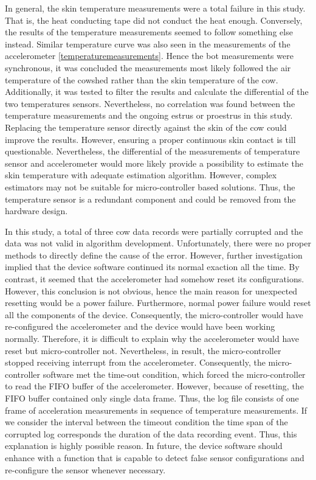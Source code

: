 \documentclass[english,12pt,a4paper,pdftex,elec,utf8]{aaltothesis}
\begin{document}
In general, the skin temperature measurements were a total failure in this study. That is, the heat conducting tape did not conduct the heat enough. Conversely, the results of the temperature measurements seemed to follow something else instead. Similar temperature curve was also seen in the measurements of the accelerometer \ref{temperaturemeasurements}. Hence the bot measurements were synchronous, it was concluded the measurements most likely followed the air temperature of the cowshed rather than the skin temperature of the cow. Additionally, it was tested to filter the results and calculate the differential of the two temperatures sensors. Nevertheless, no correlation was found between the temperature measurements and the ongoing estrus or proestrus in this study. Replacing the temperature sensor directly against the skin of the cow could improve the results. However, ensuring a proper continuous skin contact is till questionable. Nevertheless, the differential of the measurements of temperature sensor and accelerometer would more likely provide a possibility to estimate the skin temperature with adequate estimation algorithm. However, complex estimators may not be suitable for micro-controller based solutions. Thus, the temperature sensor is a redundant component and could be removed from the hardware design.

In this study, a total of three cow data records were partially corrupted and the data was not valid in algorithm development. Unfortunately, there were no proper methods to directly define the cause of the error. However, further investigation implied that the device software continued its normal exaction all the time. By contrast, it seemed that the accelerometer had somehow reset its configurations. However, this conclusion is not obvious, hence the main reason for unexpected resetting would be a power failure. Furthermore, normal power failure would reset all the components of the device. Consequently, the micro-controller would have re-configured the accelerometer and the device would have been working normally. Therefore, it is difficult to explain why the accelerometer would have reset but micro-controller not. Nevertheless, in result, the micro-controller stopped receiving interrupt from the accelerometer. Consequently, the micro-controller software met the time-out condition, which forced the micro-controller to read the FIFO buffer of the accelerometer. However, because of resetting, the FIFO buffer contained only single data frame. Thus, the log file consists of one frame of acceleration measurements in sequence of temperature measurements. If we consider the interval between the timeout condition the time span of the corrupted log corresponds the duration of the data recording event. Thus, this explanation is highly possible reason. In future, the device software should enhance with a function that is capable to detect false sensor configurations and re-configure the sensor whenever necessary.
\end{document}
